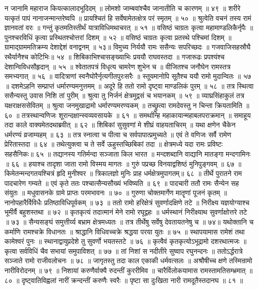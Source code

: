 न जानामि महाराज कियत्कालादभूदिदम् ॥
लोमशो जाम्बवांश्चैव जानातीति च कारणम् ॥ ४९ ॥
शरीरे यत्कृतं पापं नानाजन्मान्तरेष्वपि ॥
प्रायश्चितं हि सर्वेषामेतत्क्षेत्र परं स्मृतम् ॥ ५० ॥
श्रुत्वेति वचनं तस्य रामं ज्ञानवतां वरः ॥
गन्तुं कृतमतिस्तीर्थं यात्राविधिमथाचरत् ॥ ५१ ॥
वसिष्ठं चाग्रतः कृत्वा महामाण्डलिकैर्नृपैः ॥
पुनश्चरविधिं कृत्वा प्रस्थितश्चोत्तरां दिशम् ॥ ५२ ॥
वसिष्ठं चाग्रतः कृत्वा प्रतस्थे पश्चिमां दिशम् ॥
ग्रामाद्ग्राममतिक्रम्य देशाद्देशं वनाद्वनम् ॥ ५३॥
विमुच्य निर्ययौ रामः ससैन्यः सपरिच्छदः ॥
गजवाजिसहस्रौघै रथैर्यानैश्च कोटिभिः॥ ५४ ॥
शिबिकाभिश्चासङ्ख्याभिः प्रययौ राघवस्तदा ॥
गजारूढः प्रपश्यंश्च देशान्विविधसौहृदान् ॥ ५५ ॥
श्वेतातपत्रं विधृत्य चामरेण शुभेन च ॥
वीजितश्च जनौघेन रामस्तत्र समभ्यगात् ॥ ५६ ॥
वादित्राणां स्वनैघोरैर्नृत्यगीतपुरःसरैः ॥
स्तूयमानोपि सूतैश्च ययौ रामो मुदान्वितः ॥ ५७ ॥
दशमेऽहनि सम्प्राप्तं धर्मारण्यमनुत्तमम् ॥
अदूरे हि ततो रामो दृष्ट्वा माण्डलिकं पुरम् ॥ ५८ ॥
तत्र स्थित्वा ससैन्यस्तु उवास निशि तां पुरीम् ॥
श्रुत्वा तु निर्जनं क्षेत्रमुद्वसं च भयानकम् ॥ ५९ ॥
व्याघ्रसिंहाकुलं तत्र यक्षराक्षससेवितम् ॥
श्रुत्वा जनमुखाद्रामो धर्मारण्यमरण्यकम् ॥
तच्छ्रुत्वा रामदेवस्तु न चिन्ता क्रियतामिति ॥ ६० ॥
तत्रस्थान्वणिजः शूरान्दक्षान्स्वव्यवसायके ॥ ६१ ॥
समर्थान्हि महाकायान्महाबलपराक्रमान् ॥
समाहूय तदा काले वाक्यमेतदथाब्रवीत् ॥ ६२ ॥
शिबिकां सुसुवणां मे शीघ्रं वाहयताचिरम् ॥
यथा क्षणेन चैकेन धर्मरण्यं व्रजाम्यहम् ॥ ६३ ॥
तत्र स्नात्वा च पीत्वा च सर्वपापात्प्रमुच्यते ॥
एवं ते वणिजः सर्वै रामेण प्रेरितास्तदा ॥ ६४ ॥
तथेत्युक्त्वा च ते सर्वे ऊहुस्तच्छिबिकां तदा ॥
क्षेत्रमध्ये यदा रामः प्रविष्टः सहसैनिकः॥ ६५ ॥
तद्यानस्य गतिर्मन्दा सञ्जाता किल भारत ॥
मन्दशब्दानि वाद्यानि मातङ्गा मन्दगामिनः ॥ ६६ ॥
हयाश्च तादृशा जाता रामो विस्मय मागतः ॥
गुरुं पप्रच्छ विनयाद्वशिष्ठं मुनिपुङ्गवम् ॥ ६७ ॥
किमेतन्मन्दगतयश्चित्रं हृदि मुनीश्वर ॥
त्रिकालज्ञो मुनिः प्राह धर्मक्षेत्रमुपागतम्॥ ६८ ॥
तीर्थे पुरातने राम पादचारेण गम्यते ॥
एवं कृते ततः पश्चात्सैन्यसौख्यं भविष्यति ॥ ६९ ॥
पादचारी ततौ रामः सैन्येन सह संयुतः ॥
मधुवासनके ग्रामे प्राप्तः परमभावनः ॥ ७० ॥
गुरुणा चोक्तमार्गेण मातॄणां पूजनं कृतम् ॥
नानोपहारैर्विविधैः प्रतिष्ठाविधिपूर्वकम् ॥ ७३ ॥
ततो रामो हरिक्षेत्रं सुवर्णादक्षिणे तटे ॥
निरीक्ष्य यज्ञयोग्याश्च भूमीर्वै बहुशस्तथा ॥ ७२ ॥
कृतकृत्यं तदात्मानं मेने रामो रघूद्वहः ॥
धर्मस्थानं निरीक्ष्याथ सुवर्णाक्षोत्तरे तटे ॥ ७३ ॥
सैन्यसङ्घं समुत्तीर्य्य बभ्राम क्षेत्रमध्यतः ॥
तत्र तीर्थेषु सर्वेषु देवतायतनेषु च ॥ ७४॥
यथोक्तानि च कर्माणि रामश्चक्रे विधानतः ॥
श्राद्धानि विधिवच्चक्रे श्रद्धया परया युतः ॥ ७५ ॥
स्थापयामास रामेशं तथा कामेश्वरं पुनः ॥
स्थानाद्वायुप्रदेशे तु सुवर्णो भयतस्तटे ॥ ७६ ॥
कृत्वैवं कृतकृत्योऽभूद्रामो दशरथात्मजः ॥
कृत्वा सर्वविधिं चैव सभायां समुपाविशत् ॥ ७७ ॥
तां निशां स नदीतीरे सुष्वाप रघुनन्दनः ॥
ततोऽर्द्धरात्रे सञ्जाते रामो राजीवलोचनः ॥ ७८ ॥
जागृतस्तु तदा काल एकाकी धर्मवत्सलः ॥
अश्रौषीच्च क्षणे तस्मिन्रामो नारीविरोदनम् ॥ ७९ ॥
निशायां करुणैर्वाक्यै रुदन्तीं कुररीमिव ॥
चारैर्विलोकयामास रामस्तामतिसम्भ्रमात् ॥ ८० ॥
दृष्ट्वातिविह्वलां नारीं क्रन्दन्तीं करुणैः स्वरैः ॥
पृष्टा सा दुःखिता नारी रामदूतैस्तदानघ ॥ ८१ ॥


